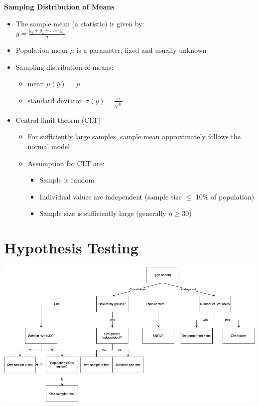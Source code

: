 \documentclass{article}
\begin{document}
\noindent
\textbf{Samplng Distribution of Means}
\begin{itemize}
    \item The sample mean (a statistic) is given by: \\
    \begin{math}\bar{y} = \frac{y_1 + y_2 +...+y_n}{n}\end{math}
    \item Population mean \begin{math}\mu\end{math} is a parameter, fixed and usually unknown
    \item Sampling distribution of means:
    \begin{itemize}
        \item mean \begin{math}\mu(\bar y)\end{math} = \begin{math}\mu\end{math}
        \item standard deviaton \begin{math}\sigma(\bar y) = \frac{\sigma}{\sqrt{n}}\end{math}
    \end{itemize}
    \item Central limit theorm (CLT)
    \begin{itemize}
        \item For sufficiently large samples, sample mean approximately follows the normal model
        \item Assumption for CLT are:
        \begin{itemize}
            \item Sample is random
            \item Individual values are independent (sample size \begin{math}\le\end{math} 10\% of population)
            \item Sample size is sufficiently large (generally \begin{math}n \ge 30\end{math})
        \end{itemize}
    \end{itemize}
\end{itemize}

\section{Hypothesis Testing}
\includegraphics[scale = 0.5]{dec-tree.png}
\end{document}

